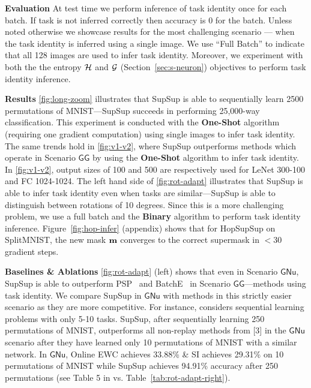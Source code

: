 \documentclass{article}
\newcommand{\ac}{SupSup\xspace}
\newcommand{\casename}[1]{\ensuremath{\mathsf{#1}}\xspace}
\begin{document}
\textbf{Evaluation } At test time we perform inference of task identity once for each batch. If task is not inferred correctly then accuracy is 0 for the batch. Unless noted otherwise we showcase results for the most challenging scenario --- when the task identity is inferred using a single image. We use ``Full Batch'' to indicate that all 128 images are used to infer task identity. Moreover, we experiment with both the the entropy $\mathcal{H}$ and $\mathcal{G}$ (Section~\ref{sec:s-neuron}) objectives to perform task identity inference.

\textbf{Results } \autoref{fig:long-zoom} illustrates that \ac is able to sequentially learn 2500 permutations of MNIST---\ac succeeds in performing 25,000-way classification. This experiment is conducted with the \textbf{One-Shot} algorithm (requiring one gradient computation) using single images to infer task identity. The same trends hold in \autoref{fig:v1-v2}, where \ac outperforms methods which operate in Scenario \casename{GG} by using the \textbf{One-Shot} algorithm to infer task identity. In \autoref{fig:v1-v2}, output sizes of 100 and 500 are respectively used for LeNet 300-100 and FC 1024-1024. The left hand side of \autoref{fig:rot-adapt} illustrates that \ac is able to infer task identity even when tasks are similar---\ac is able to distinguish between rotations of 10 degrees. Since this is a more challenging problem, we use a full batch and the \textbf{Binary} algorithm to perform task identity inference. Figure~\ref{fig:hop-infer} (appendix) shows that for HopSupSup on SplitMNIST, the new mask $\mathbf{m}$ converges to the correct supermask in $<30$ gradient steps.

\textbf{Baselines \& Ablations } \autoref{fig:rot-adapt} (left) shows that even in Scenario \casename{GNu}, \ac is able to outperform PSP~\cite{cheung2019superposition} and BatchE~\cite{wen2020batchensemble} in Scenario \casename{GG}---methods using task identity. We compare SupSup in \casename{GNu} with methods in this strictly easier scenario as they are more competitive. For instance, \cite{van2019three} considers sequential learning problems with only 5-10 tasks. SupSup, after sequentially learning 250 permutations of MNIST, outperforms all non-replay methods from [3] in the \casename{GNu} scenario after they have learned only 10 permutations of MNIST with a similar network. In \casename{GNu}, Online EWC achieves 33.88\% \& SI achieves 29.31\% on 10 permutations of MNIST \cite{van2019three} while SupSup achieves 94.91\% accuracy after 250 permutations (see Table 5 in \cite{van2019three} vs. Table~\ref{tab:rot-adapt-right}). 
\end{document}
